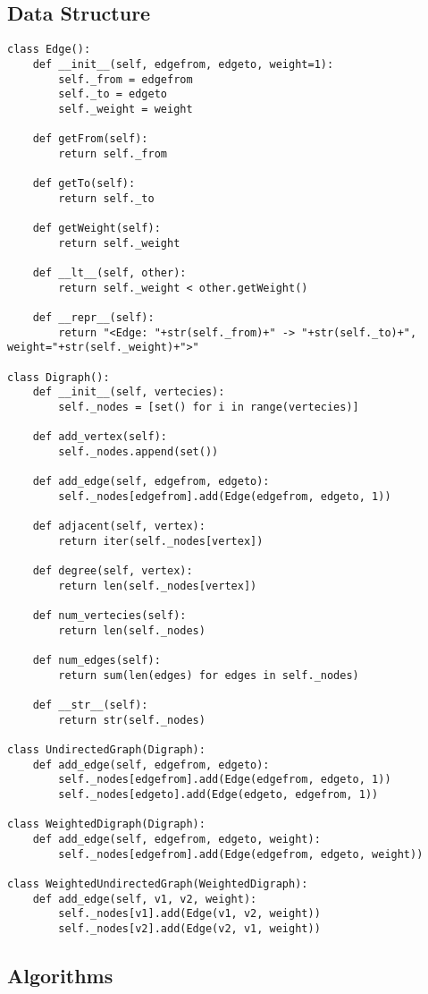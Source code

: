 \documentclass[12pt]{article}
\begin{document}
\subsection{Data Structure}
\begin{lstlisting}
class Edge():
	def __init__(self, edgefrom, edgeto, weight=1):
		self._from = edgefrom
		self._to = edgeto
		self._weight = weight

	def getFrom(self):
		return self._from

	def getTo(self):
		return self._to

	def getWeight(self):
		return self._weight

	def __lt__(self, other):
		return self._weight < other.getWeight()

	def __repr__(self):
		return "<Edge: "+str(self._from)+" -> "+str(self._to)+", weight="+str(self._weight)+">"

class Digraph():
	def __init__(self, vertecies):
		self._nodes = [set() for i in range(vertecies)]

	def add_vertex(self):
		self._nodes.append(set())

	def add_edge(self, edgefrom, edgeto):
		self._nodes[edgefrom].add(Edge(edgefrom, edgeto, 1))

	def adjacent(self, vertex):
		return iter(self._nodes[vertex])

	def degree(self, vertex):
		return len(self._nodes[vertex])

	def num_vertecies(self):
		return len(self._nodes)

	def num_edges(self):
		return sum(len(edges) for edges in self._nodes)

	def __str__(self):
		return str(self._nodes)

class UndirectedGraph(Digraph):
	def add_edge(self, edgefrom, edgeto):
		self._nodes[edgefrom].add(Edge(edgefrom, edgeto, 1))
		self._nodes[edgeto].add(Edge(edgeto, edgefrom, 1))

class WeightedDigraph(Digraph):
	def add_edge(self, edgefrom, edgeto, weight):
		self._nodes[edgefrom].add(Edge(edgefrom, edgeto, weight))

class WeightedUndirectedGraph(WeightedDigraph):
	def add_edge(self, v1, v2, weight):
		self._nodes[v1].add(Edge(v1, v2, weight))
		self._nodes[v2].add(Edge(v2, v1, weight))
\end{lstlisting}

\subsection{Algorithms}
\end{document}
